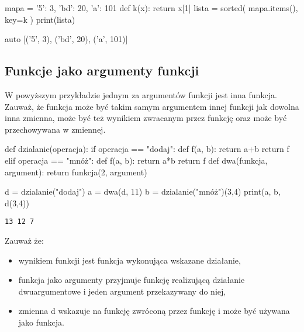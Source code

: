 \documentclass{pdfBooklets}
\begin{document}
\begin{CodeFrame}[python]{0.50\textwidth}
mapa = {'5': 3, 'bd': 20, 'a': 101}
def k(x):
    return x[1]
lista = sorted( mapa.items(), key=k )
print(lista)
\end{CodeFrame}
\begin{CodeFrame}{auto}
[('5', 3), ('bd', 20), ('a', 101)]
\end{CodeFrame}

\subsection{Funkcje jako argumenty funkcji {\Symbola 🤔}}

W powyższym przykładzie jednym za argumentów funkcji  jest inna funkcja.
Zauważ, że funkcja może być takim samym argumentem innej funkcji jak dowolna inna zmienna,
może być też wynikiem zwracanym przez funkcję oraz może być przechowywana w zmiennej.

\begin{CodeFrame}[python]{0.50\textwidth}
def dzialanie(operacja):
    if operacja == "dodaj":
        def f(a, b):
            return a+b
        return f
    elif operacja == "mnóż":
        def f(a, b):
            return a*b
        return f
def dwa(funkcja, argument):
    return funkcja(2, argument)

d = dzialanie("dodaj")
a = dwa(d, 11)
b = dzialanie("mnóż")(3,4)
print(a, b, d(3,4))
\end{CodeFrame}
\begin{minipage}[t]{0.46\textwidth}
\begin{Verbatim}[frame=single]
13 12 7
\end{Verbatim}

\vspace{6pt}\noindent Zauważ że:
\begin{itemize}[leftmargin=7mm]
\item wynikiem funkcji  jest funkcja wykonująca wskazane działanie,
\item funkcja  jako argumenty przyjmuje funkcję realizującą działanie dwuargumentowe i jeden argument przekazywany do niej,
\item zmienna d wskazuje na funkcję zwróconą przez funkcję  i może być używana jako funkcja.
\end{itemize}
\end{minipage}
\end{document}
